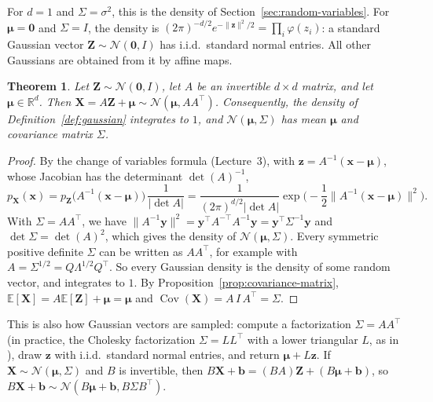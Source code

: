 \documentclass[11pt]{article}
\newcommand{\py}[1]{\texttt{\detokenize{#1}}}
\newcommand{\norm}[1]{\lVert #1 \rVert}
\newcommand{\E}{\mathbb{E}}
\DeclareMathOperator{\Cov}{Cov}
\theoremstyle{definition}
\theoremstyle{plain}
\newtheorem{theorem}[definition]{Theorem}
\theoremstyle{remark}
\begin{document}
For $d = 1$ and $\Sigma = \sigma^2$, this is the density of Section~\ref{sec:random-variables}. For $\boldsymbol{\mu} = \mathbf{0}$ and $\Sigma = I$, the density is $(2\pi)^{-d/2}e^{-\norm{\mathbf{z}}^2/2} = \prod_i \varphi(z_i)$: a standard Gaussian vector $\mathbf{Z} \sim \mathcal{N}(\mathbf{0}, I)$ has i.i.d.\ standard normal entries. All other Gaussians are obtained from it by affine maps.

\begin{theorem}\label{thm:gaussian-affine}
    Let $\mathbf{Z} \sim \mathcal{N}(\mathbf{0}, I)$, let $A$ be an invertible $d \times d$ matrix, and let $\boldsymbol{\mu} \in \mathbb{R}^d$. Then $\mathbf{X} = A\mathbf{Z} + \boldsymbol{\mu} \sim \mathcal{N}(\boldsymbol{\mu}, AA^\top)$. Consequently, the density of Definition~\ref{def:gaussian} integrates to $1$, and $\mathcal{N}(\boldsymbol{\mu}, \Sigma)$ has mean $\boldsymbol{\mu}$ and covariance matrix $\Sigma$.
\end{theorem}

\begin{proof}
    By the change of variables formula (Lecture~3), with $\mathbf{z} = A^{-1}(\mathbf{x} - \boldsymbol{\mu})$, whose Jacobian has the determinant $\det(A)^{-1}$,
    \[p_{\mathbf{X}}(\mathbf{x}) = p_{\mathbf{Z}}\big(A^{-1}(\mathbf{x} - \boldsymbol{\mu})\big)\,\frac{1}{|\det A|} = \frac{1}{(2\pi)^{d/2}|\det A|}\exp\Big(-\frac{1}{2}\norm{A^{-1}(\mathbf{x} - \boldsymbol{\mu})}^2\Big).\]
    With $\Sigma = AA^\top$, we have $\norm{A^{-1}\mathbf{y}}^2 = \mathbf{y}^\top A^{-\top}A^{-1}\mathbf{y} = \mathbf{y}^\top\Sigma^{-1}\mathbf{y}$ and $\det\Sigma = \det(A)^2$, which gives the density of $\mathcal{N}(\boldsymbol{\mu}, \Sigma)$. Every symmetric positive definite $\Sigma$ can be written as $AA^\top$, for example with $A = \Sigma^{1/2} = Q\Lambda^{1/2}Q^\top$. So every Gaussian density is the density of some random vector, and integrates to $1$. By Proposition~\ref{prop:covariance-matrix}, $\E[\mathbf{X}] = A\E[\mathbf{Z}] + \boldsymbol{\mu} = \boldsymbol{\mu}$ and $\Cov(\mathbf{X}) = A\,I\,A^\top = \Sigma$.
\end{proof}

This is also how Gaussian vectors are sampled: compute a factorization $\Sigma = AA^\top$ (in practice, the Cholesky factorization $\Sigma = LL^\top$ with a lower triangular $L$, as in \py{np.linalg.cholesky}), draw $\mathbf{z}$ with i.i.d.\ standard normal entries, and return $\boldsymbol{\mu} + L\mathbf{z}$. If $\mathbf{X} \sim \mathcal{N}(\boldsymbol{\mu}, \Sigma)$ and $B$ is invertible, then $B\mathbf{X} + \mathbf{b} = (BA)\mathbf{Z} + (B\boldsymbol{\mu} + \mathbf{b})$, so $B\mathbf{X} + \mathbf{b} \sim \mathcal{N}(B\boldsymbol{\mu} + \mathbf{b}, B\Sigma B^\top)$.
\end{document}

